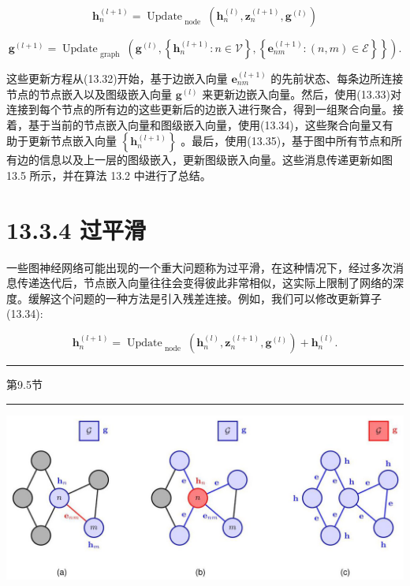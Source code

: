 \documentclass[10pt]{report}
\newcommand{\HRule}{\begin{center}\rule{0.9\linewidth}{0.2mm}\end{center}}
\begin{document}
\[
{\mathbf{h}}_{n}^{\left( l + 1\right) } = {\operatorname{Update}}_{\text{ node }}\left( {{\mathbf{h}}_{n}^{\left( l\right) },{\mathbf{z}}_{n}^{\left( l + 1\right) },{\mathbf{g}}^{\left( l\right) }}\right)  \tag{13.34}
\]

\[
\left. {{\mathbf{g}}^{\left( l + 1\right) } = {\operatorname{Update}}_{\text{ graph }}\left( {{\mathbf{g}}^{\left( l\right) },\left\{  {{\mathbf{h}}_{n}^{\left( l + 1\right) } : n \in  \mathcal{V}}\right\}  ,\left\{  {{\mathbf{e}}_{nm}^{\left( l + 1\right) } : \left( {n,m}\right)  \in  \mathcal{E}}\right\}  }\right\}  }\right) . \tag{13.35}
\]

这些更新方程从(13.32)开始，基于边嵌入向量 \({\mathbf{e}}_{nm}^{\left( l + 1\right) }\) 的先前状态、每条边所连接节点的节点嵌入以及图级嵌入向量 \({\mathbf{g}}^{\left( l\right) }\) 来更新边嵌入向量。然后，使用(13.33)对连接到每个节点的所有边的这些更新后的边嵌入进行聚合，得到一组聚合向量。接着，基于当前的节点嵌入向量和图级嵌入向量，使用(13.34)，这些聚合向量又有助于更新节点嵌入向量 \(\left\{  {\mathbf{h}}_{n}^{\left( l + 1\right) }\right\}\) 。最后，使用(13.35)，基于图中所有节点和所有边的信息以及上一层的图级嵌入，更新图级嵌入向量。这些消息传递更新如图 13.5 所示，并在算法 13.2 中进行了总结。

\section*{13.3.4 过平滑}

一些图神经网络可能出现的一个重大问题称为过平滑，在这种情况下，经过多次消息传递迭代后，节点嵌入向量往往会变得彼此非常相似，这实际上限制了网络的深度。缓解这个问题的一种方法是引入残差连接。例如，我们可以修改更新算子(13.34):

\[
{\mathbf{h}}_{n}^{\left( l + 1\right) } = {\operatorname{Update}}_{\text{ node }}\left( {{\mathbf{h}}_{n}^{\left( l\right) },{\mathbf{z}}_{n}^{\left( l + 1\right) },{\mathbf{g}}^{\left( l\right) }}\right)  + {\mathbf{h}}_{n}^{\left( l\right) }. \tag{13.36}
\]

\HRule

第9.5节

\HRule

\begin{center}
\includegraphics[max width=1.0\textwidth]{images/0194e279-9b28-703a-88f4-c3ac21e2010d_442_234_340_1307_542_0.jpg}
\end{center}
\hspace*{3em} 
\end{document}

